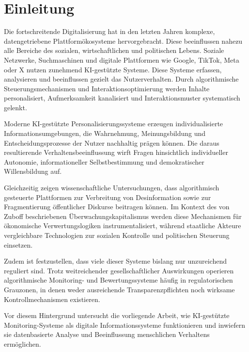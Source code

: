 \chapter{Einleitung}

Die fortschreitende Digitalisierung hat in den letzten Jahren komplexe, datengetriebene Plattformökosysteme hervorgebracht. Diese beeinflussen nahezu alle Bereiche des sozialen, wirtschaftlichen und politischen Lebens. Soziale Netzwerke, Suchmaschinen und digitale Plattformen wie Google, TikTok, Meta oder X nutzen zunehmend \ac{KI}-gestützte Systeme. Diese Systeme erfassen, analysieren und beeinflussen gezielt das Nutzerverhalten. Durch algorithmische Steuerungsmechanismen und Interaktionsoptimierung werden Inhalte personalisiert, Aufmerksamkeit kanalisiert und Interaktionsmuster systematisch gelenkt.

Moderne \ac{KI}-gestützte Personalisierungssysteme erzeugen individualisierte Informationsumgebungen, die Wahrnehmung, Meinungsbildung und Entscheidungsprozesse der Nutzer nachhaltig prägen können. Die daraus resultierende Verhaltensbeeinflussung wirft Fragen hinsichtlich individueller Autonomie, informationeller Selbstbestimmung und demokratischer Willensbildung auf.

Gleichzeitig zeigen wissenschaftliche Untersuchungen, dass algorithmisch gesteuerte Plattformen zur Verbreitung von Desinformation sowie zur Fragmentierung öffentlicher Diskurse beitragen können. Im Kontext des von Zuboff beschriebenen Überwachungskapitalismus werden diese Mechanismen für ökonomische Verwertungslogiken instrumentalisiert, während staatliche Akteure vergleichbare Technologien zur sozialen Kontrolle und politischen Steuerung einsetzen.

Zudem ist festzustellen, dass viele dieser Systeme bislang nur unzureichend reguliert sind. Trotz weitreichender gesellschaftlicher Auswirkungen operieren algorithmische Monitoring- und Bewertungssysteme häufig in regulatorischen Grauzonen, in denen weder ausreichende Transparenzpflichten noch wirksame Kontrollmechanismen existieren.

Vor diesem Hintergrund untersucht die vorliegende Arbeit, wie \ac{KI}-gestützte Monitoring-Systeme als digitale Informationssysteme funktionieren und inwiefern sie datenbasierte Analyse und Beeinflussung menschlichen Verhaltens ermöglichen.


